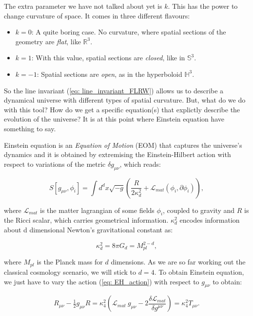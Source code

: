 \documentclass[11pt, a4paper]{article} %
\renewcommand{\it}{\textit}
\begin{document}
The extra parameter we have not talked about yet is $k$. This has the power to change curvature of space. It comes in three different flavours:

\begin{itemize}
	\item $k = 0$: A quite boring case. No curvature, where spatial sections of the geometry are \it{flat}, like $\mathbb{R}^{3}$.
	\item $k = 1$: With this value, spatial sections are \it{closed}, like in $\mathbb{S}^{3}$.
	\item $k = -1$: Spatial sections are \it{open}, as in the hyperboloid $\mathbb{H}^{3}$.
\end{itemize}

So the line invariant (\ref{eq: line_invariant_FLRW}) allows us to describe a dynamical universe with different types of spatial curvature. But, what do we do with this tool? How do we get a specific equation(s) that explictly describe the evolution of the universe? It is at this point where Einstein equation have something to say. 

Einstein equation is an \textit{Equation of Motion} (EOM) that captures the universe's dynamics and it is obtained by extremising the Einstein-Hilbert action with respect to variations of the metric $\delta g_{\mu\nu}$, which reads:

\begin{equation}\label{eq: EH_action}
	S[g_{\mu\nu}, \phi_{i}] = \int d^{d}x \sqrt{-g} \left(\frac{R}{2 \kappa^{2}_{d}} + \mathcal{L}_{mat}(\phi_{i}, \partial \phi_{i})\right), 
\end{equation}

where $\mathcal{L}_{mat}$ is the matter lagrangian of some fields $\phi_{i}$, coupled to gravity and $R$ is the Ricci scalar, which carries geometrical information. $\kappa^{2}_{d}$ encodes information about d dimensional Newton's gravitational constant as:

\begin{equation}
	\kappa^{2}_{d} = 8 \pi G_{d} = M_{pl}^{2-d},
\end{equation}

where $M_{pl}$ is the Planck mass for $d$ dimensions. As we are so far working out the classical cosmology scenario, we will stick to $d = 4$. To obtain Einstein equation, we just have to vary the action (\ref{eq: EH_action}) with respect to $g_{\mu \nu}$ to obtain:

\begin{equation}\label{eq: Einstein}
		R_{\mu\nu} - \tfrac{1}{2} g_{\mu\nu} R = \kappa^{2}_{4} \left(\mathcal{L}_{mat}\: g_{\mu\nu} - 2 \frac{\delta \mathcal{L}_{mat}}{\delta g^{\mu \nu}}\right) = \kappa^{2}_{4} T_{\mu \nu}.
\end{equation}
\end{document}
